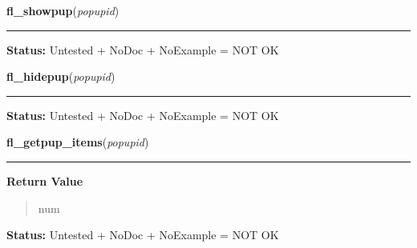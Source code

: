     \vspace{0.5ex}

\hspace{.8\funcindent}\begin{boxedminipage}{\funcwidth}

    \raggedright \textbf{fl\_showpup}(\textit{popupid})

    \vspace{-1.5ex}

    \rule{\textwidth}{0.5\fboxrule}
\setlength{\parskip}{2ex}
\setlength{\parskip}{1ex}
\textbf{Status:} Untested + NoDoc + NoExample = NOT OK



    \end{boxedminipage}

    \label{xformslib:library:fl_hidepup}

    \vspace{0.5ex}

\hspace{.8\funcindent}\begin{boxedminipage}{\funcwidth}

    \raggedright \textbf{fl\_hidepup}(\textit{popupid})

    \vspace{-1.5ex}

    \rule{\textwidth}{0.5\fboxrule}
\setlength{\parskip}{2ex}
\setlength{\parskip}{1ex}
\textbf{Status:} Untested + NoDoc + NoExample = NOT OK



    \end{boxedminipage}

    \label{xformslib:library:fl_getpup_items}

    \vspace{0.5ex}

\hspace{.8\funcindent}\begin{boxedminipage}{\funcwidth}

    \raggedright \textbf{fl\_getpup\_items}(\textit{popupid})

    \vspace{-1.5ex}

    \rule{\textwidth}{0.5\fboxrule}
\setlength{\parskip}{2ex}
\setlength{\parskip}{1ex}
      \textbf{Return Value}
    \vspace{-1ex}

      \begin{quote}
      num

      \end{quote}

\textbf{Status:} Untested + NoDoc + NoExample = NOT OK



    \end{boxedminipage}

